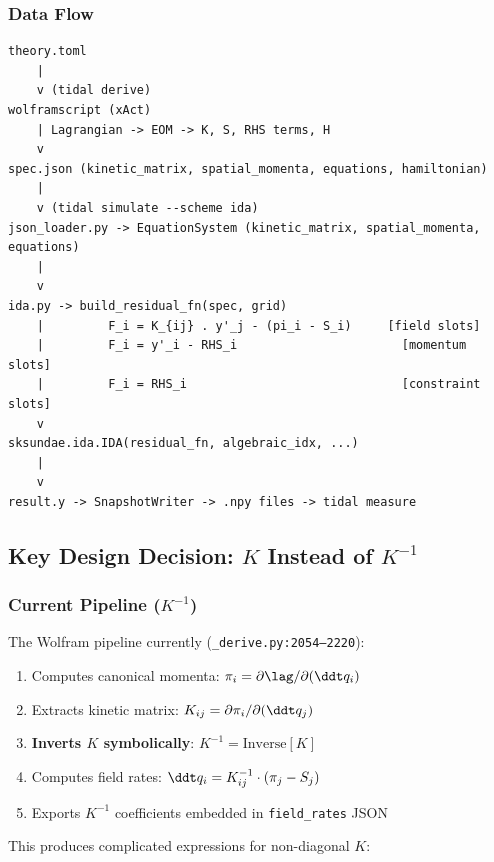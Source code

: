 \subsubsection{Data Flow}
\label{sec:data-flow}

\begin{lstlisting}[style=bash]
theory.toml
    |
    v (tidal derive)
wolframscript (xAct)
    | Lagrangian -> EOM -> K, S, RHS terms, H
    v
spec.json (kinetic_matrix, spatial_momenta, equations, hamiltonian)
    |
    v (tidal simulate --scheme ida)
json_loader.py -> EquationSystem (kinetic_matrix, spatial_momenta, equations)
    |
    v
ida.py -> build_residual_fn(spec, grid)
    |         F_i = K_{ij} . y'_j - (pi_i - S_i)     [field slots]
    |         F_i = y'_i - RHS_i                       [momentum slots]
    |         F_i = RHS_i                              [constraint slots]
    v
sksundae.ida.IDA(residual_fn, algebraic_idx, ...)
    |
    v
result.y -> SnapshotWriter -> .npy files -> tidal measure
\end{lstlisting}

\subsection{Key Design Decision: $K$ Instead of $K^{-1}$}
\label{sec:K-design}

\subsubsection{Current Pipeline ($K^{-1}$)}
\label{sec:old-pipeline}

The Wolfram pipeline currently (\texttt{\_derive.py:2054--2220}):

\begin{enumerate}
  \item Computes canonical momenta: $\pi_i = \partial\lag/\partial(\ddt q_i)$
  \item Extracts kinetic matrix: $K_{ij} = \partial\pi_i/\partial(\ddt q_j)$
  \item \textbf{Inverts $K$ symbolically}: $K^{-1} = \mathrm{Inverse}[K]$
  \item Computes field rates: $\ddt q_i = K^{-1}_{ij} \cdot (\pi_j - S_j)$
  \item Exports $K^{-1}$ coefficients embedded in \texttt{field\_rates} JSON
\end{enumerate}

This produces complicated expressions for non-diagonal $K$:

